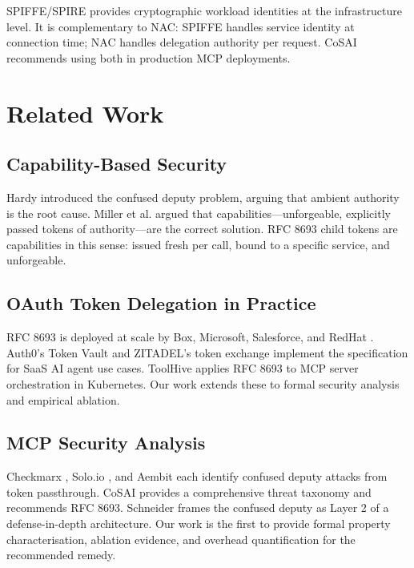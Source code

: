 \documentclass[journal]{IEEEtran}
\begin{document}
SPIFFE/SPIRE \cite{spiffe} provides cryptographic workload identities at the
infrastructure level. It is complementary to NAC: SPIFFE handles service
identity at connection time; NAC handles delegation authority per request. CoSAI
\cite{cosai_mcp} recommends using both in production MCP deployments.


\FloatBarrier  %

\section{Related Work}
\label{sec:related}

\subsection{Capability-Based Security}

Hardy \cite{hardy1988} introduced the confused deputy problem, arguing that
ambient authority is the root cause. Miller et al. \cite{miller2003} argued that
capabilities---unforgeable, explicitly passed tokens of authority---are the
correct solution. RFC 8693 child tokens are capabilities in this sense: issued
fresh per call, bound to a specific service, and unforgeable.

\subsection{OAuth Token Delegation in Practice}

RFC 8693 \cite{rfc8693} is deployed at scale by Box, Microsoft, Salesforce, and
RedHat \cite{rfc8693_deploy}. Auth0's Token Vault \cite{auth0_token_vault} and
ZITADEL's token exchange \cite{zitadel_te} implement the specification for SaaS
AI agent use cases. ToolHive \cite{toolhive} applies RFC 8693 to MCP server
orchestration in Kubernetes. Our work extends these to formal security analysis
and empirical ablation.

\subsection{MCP Security Analysis}

Checkmarx \cite{checkmarx_mcp}, Solo.io \cite{solo_mcp}, and Aembit
\cite{aembit_mcp} each identify confused deputy attacks from token passthrough.
CoSAI \cite{cosai_mcp} provides a comprehensive threat taxonomy and recommends
RFC 8693. Schneider \cite{schneider_mcp} frames the confused deputy as Layer 2
of a defense-in-depth architecture. Our work is the first to provide formal
property characterisation, ablation evidence, and overhead quantification for the
recommended remedy.
\end{document}
